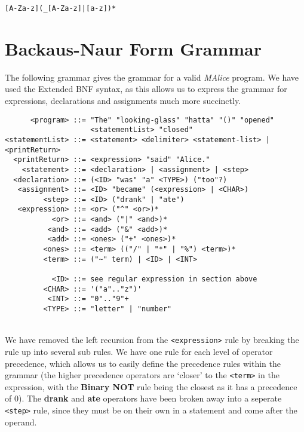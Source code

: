 \documentclass[a4, 11pt]{article}
\begin{document}
\begin{center}
  \texttt{[A-Za-z](_[A-Za-z]|[a-z])*}
\end{center}

\section*{Backaus-Naur Form Grammar}
The following grammar gives the grammar for a valid \emph{MAlice} program. We have used the Extended BNF syntax, as this allows us to express the grammar for expressions, declarations and assignments much more succinctly.\\
\begin{verbatim}
      <program> ::= "The" "looking-glass" "hatta" "()" "opened" 
                    <statementList> "closed"
<statementList> ::= <statement> <delimiter> <statement-list> | <printReturn>
  <printReturn> ::= <expression> "said" "Alice."
    <statement> ::= <declaration> | <assignment> | <step>
  <declaration> ::= (<ID> "was" "a" <TYPE>) ("too"?)
   <assignment> ::= <ID> "became" (<expression> | <CHAR>)
         <step> ::= <ID> ("drank" | "ate")
   <expression> ::= <or> ("^" <or>)*
           <or> ::= <and> ("|" <and>)*
          <and> ::= <add> ("&" <add>)*
          <add> ::= <ones> ("+" <ones>)*
         <ones> ::= <term> (("/" | "*" | "%") <term>)*
         <term> ::= ("~" term) | <ID> | <INT>
         
           <ID> ::= see regular expression in section above
         <CHAR> ::= '("a".."z")'
          <INT> ::= "0".."9"+
         <TYPE> ::= "letter" | "number"
\end{verbatim}\\
We have removed the left recursion from the \texttt{<expression>} rule by breaking the rule up into several sub rules. We have one rule for each level of operator precedence, which allows us to easily define the precedence rules within the grammar (the higher precedence operators are \textquoteleft closer\textquoteright{} to the \texttt{<term>} in the expression, with the \textbf{Binary NOT} rule being the closest as it has a precedence of 0). The \textbf{drank} and \textbf{ate} operators have been broken away into a seperate \texttt{<step>} rule, since they must be on their own in a statement and come after the operand. 
\end{document}
